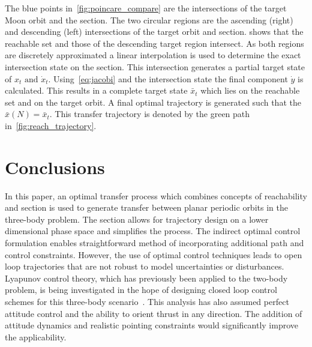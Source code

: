 The blue points in~\cref{fig:poincare_compare} are the intersections of the target Moon orbit and the \Poincare section.
The two circular regions are the ascending (right) and descending (left) intersections of the target orbit and \Poincare section.
 shows that the reachable set and those of the descending target region intersect.
As both regions are discretely approximated a linear interpolation is used to determine the exact intersection state on the \Poincare section.
This intersection generates a partial target state of \( x_t \text{ and } \dot{x}_t \).
Using~\cref{eq:jacobi} and the intersection state the final component \( \dot{y} \) is calculated. 
This results in a complete target state \( \bar{x}_t \) which lies on the reachable set and on the target orbit. 
A final optimal trajectory is generated such that the \( \bar{x}(N) = \bar{x}_t \).
This transfer trajectory is denoted by the green path in~\cref{fig:reach_trajectory}.


%
%
%
%
\section{Conclusions}\label{sec:conclusion}
In this paper, an optimal transfer process which combines concepts of reachability and \Poincare section is used to generate transfer between planar periodic orbits in the three-body problem.
The \Poincare section allows for trajectory design on a lower dimensional phase space and simplifies the process.
The indirect optimal control formulation enables straightforward method of incorporating additional path and control constraints.
However, the use of optimal control techniques leads to open loop trajectories that are not robust to model uncertainties or disturbances.
Lyapunov control theory, which has previously been applied to the two-body problem, is being investigated in the hope of designing closed loop control schemes for this three-body scenario~\cite{chang2002}.
This analysis has also assumed perfect attitude control and the ability to orient thrust in any direction.
The addition of attitude dynamics and realistic pointing constraints would significantly improve the applicability.


